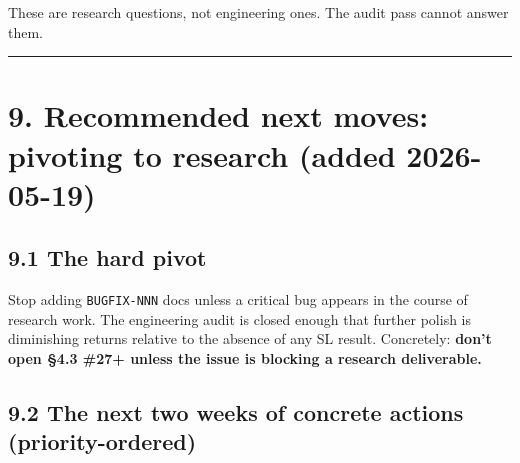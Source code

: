\documentclass[10pt,a4paper]{article}
\begin{document}
These are research questions, not engineering ones. The audit pass cannot answer them.

\vspace{0.5em}\hrule\vspace{0.5em}

\section*{9. Recommended next moves: pivoting to research (added 2026-05-19)}

\subsection*{9.1 The hard pivot}

Stop adding \texttt{BUGFIX-NNN} docs unless a critical bug appears in the course of research work. The engineering audit is closed enough that further polish is diminishing returns relative to the absence of any SL result. Concretely: \textbf{don't open §4.3 \#27+ unless the issue is blocking a research deliverable.}

\subsection*{9.2 The next two weeks of concrete actions (priority-ordered)}
\end{document}
